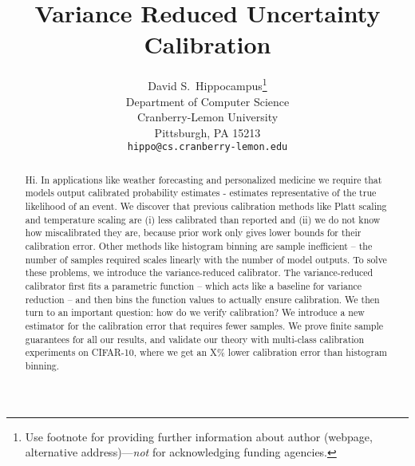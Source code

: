 \documentclass{article}
\title{Variance Reduced Uncertainty Calibration}
\author{%
  David S.~Hippocampus\thanks{Use footnote for providing further information
    about author (webpage, alternative address)---\emph{not} for acknowledging
    funding agencies.} \\
  Department of Computer Science\\
  Cranberry-Lemon University\\
  Pittsburgh, PA 15213 \\
  \texttt{hippo@cs.cranberry-lemon.edu} \\
}
\newcommand{\pl}[1]{\textcolor{red}{[PL: #1]}}
\begin{document}
\maketitle

\begin{abstract}
Hi. In applications like weather forecasting and personalized medicine we require that models output calibrated probability estimates - estimates representative of the true likelihood of an event. We discover that previous calibration methods like Platt scaling and temperature scaling are (i) less calibrated than reported and (ii) we do not know how miscalibrated they are, because prior work only gives lower bounds for their calibration error. Other methods like histogram binning are sample inefficient -- the number of samples required scales linearly with the number of model outputs. To solve these problems, we introduce the variance-reduced calibrator. The variance-reduced calibrator first fits a parametric function -- which acts like a baseline for variance reduction -- and then bins the function values to actually ensure calibration. We then turn to an important question: how do we verify calibration? We introduce a new estimator for the calibration error that requires fewer samples. We prove finite sample guarantees for all our results, and validate our theory with multi-class calibration experiments on CIFAR-10, where we get an X\% lower calibration error than histogram binning.

\end{abstract}
\end{document}
